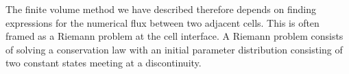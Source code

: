 


The finite volume method we have described therefore depends on finding expressions for the numerical flux between two adjacent cells.
This is often framed as a Riemann problem at the cell interface.
A Riemann problem consists of solving a conservation law with an initial parameter distribution consisting of two constant states meeting at a discontinuity.


